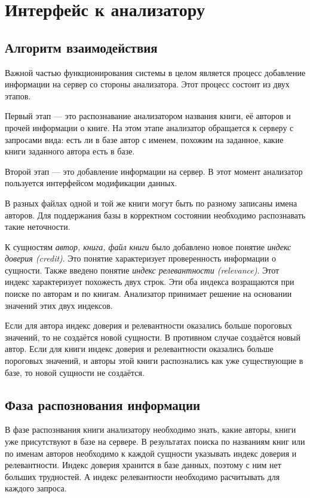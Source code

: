 \section{Интерфейс к анализатору}


\subsection{Алгоритм взаимодействия}

Важной частью функционирования системы в целом является процесс добавление информации на сервер со стороны анализатора. Этот процесс состоит из двух этапов. 

Первый этап --- это распознавание анализатором названия книги, её авторов и прочей информации о книге. На этом этапе анализатор обращается к серверу с запросами вида: есть ли в базе автор с именем, похожим на заданное, какие книги заданного автора есть в базе.

Второй этап --- это добавление информации на сервер. В этот момент анализатор пользуется интерфейсом модификации данных.


В разных файлах одной и той же книги могут быть по разному записаны имена авторов. Для поддержания базы в корректном состоянии необходимо распознавать такие неточности.

К сущностям {\em автор, книга, файл книги} было добавлено новое понятие {\em индекс доверия (credit)}. Это понятие характеризует проверенность информации о сущности.
Также введено понятие {\em индекс релевантности (relevance)}. Этот индекс характеризует похожесть двух строк.
Эти оба индекса возращаются при поиске по авторам и по книгам.
Анализатор принимает решение на основании значений этих двух индексов.

Если для автора индекс доверия и релевантности оказались больше пороговых значений, то не создаётся новой сущности.
В противном случае создаётся новый автор.
Если для книги индекс доверия и релевантности оказались больше пороговых значений, и авторы этой книги распознались как уже существующие в базе, то новой сущности не создаётся.

\subsection{Фаза распознования информации}

В фазе распознвания книги анализатору необходимо знать, какие авторы, книги уже присутствуют в базе на сервере.
В результатах поиска по названиям книг или по именам авторов необходимо к каждой сущности указывать индекс доверия и релевантности.
Индекс доверия хранится в базе данных, поэтому с ним нет больших трудностей.
А индекс релевантности необходимо расчитывать для каждого запроса.

